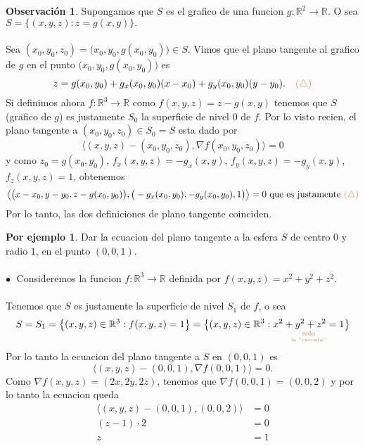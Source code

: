 \documentclass{article}
\theoremstyle{definition}
\newtheorem*{obs}{Observación}
\newtheorem*{ej}{Por ejemplo}
\theoremstyle{remark}
\newcommand\bl{$\bullet\;$}
\begin{document}
  \begin{figure}[h]
\centering
\def\svgwidth{0.65\textwidth}
\makebox[\textwidth]{
}
\end{figure} 
\begin{obs}
  Supongamos que $S$ es el grafico de una funcion $g : \mathbb{R}^2 \to \mathbb{R}$. O sea $S=\big\{(x,y,z) : z=g(x,y)\big\}.$ \\\\ Sea $(x_0,y_0,z_0)=\big(x_0,y_0,g(x_0,y_0)\big) \in S$. Vimos que el plano tangente al grafico de $g$ en el punto $\big(x_0,y_0,g(x_0,y_0)\big)$ es \[
    z=g(x_0,y_0)+g_x(x_0,y_0)(x-x_0)+g_y(x_0,y_0)(y-y_0). \quad \textcolor{rojop2}{(\triangle)}
    \] Si definimos ahora $f : \mathbb{R}^3 \to \mathbb{R}$ como $f(x,y,z)=z-g(x,y)$ tenemos que $S$ (grafico de $g$) es justamente $S_0$ la superficie de nivel $0$ de $f$. Por lo visto recien, el plano tangente a $(x_0,y_0,z_0) \in S_0=S$ esta dado por \[
\big\langle (x,y,z)-(x_0,y_0,z_0),\nabla f(x_0,y_0,z_0) \big\rangle =0
\]y como $z_0=g(x_0,y_0)$, $f_x(x,y,z)=-g_x(x,y)$, \mbox{$f_y(x,y,z)=-g_y(x,y)$}, \mbox{$f_z(x,y,z)=1$,} obtenemos \[
\big\langle \big(x-x_0,y-y_0,z-g(x_0,y_0)\big),\big(-g_x(x_0,y_0),-g_y(x_0,y_0),1\big) \big\rangle =0 \text{ que es justamente }\textcolor{rojop2}{(\triangle)}
\] Por lo tanto, las dos definiciones de plano tangente coinciden.
\end{obs}
\begin{ej}
  Dar la ecuacion del plano tangente a la esfera $S$ de centro $0$ y radio $1$, en el punto $(0,0,1)$. \\\\
  \textcolor{rojop2}{\bl} Consideremos la funcion $f : \mathbb{R}^3 \to \mathbb{R}$ definida por $f(x,y,z)=x^2+y^2+z^2$.\\\\ Tenemos que $S$ es justamente la superficie de nivel $S_1$ de $f$, o sea \[
    S=S_1=\big\{(x,y,z) \in \mathbb{R}^3 : f(x,y,z)=1\big\}=\big\{(x,y,z) \in \mathbb{R}^3 : \underset{\underset{\textcolor{rojop2}{\text{la ``cascara''}}}{\textcolor{rojop2}{\text{solo}}}}{x^2+y^2+z^2 = 1}\big\}
    \]Por lo tanto la ecuacion del plano tangente a $S$ en $(0,0,1)$ es \[
\big\langle (x,y,z)-(0,0,1),\nabla f(0,0,1) \big\rangle = 0.
\] Como $\nabla f(x,y,z)=(2x,2y,2z)$, tenemos que $\nabla f (0,0,1)=(0,0,2)$ y por lo tanto la ecuacion queda \[
\begin{aligned}
  \big\langle (x,y,z) - (0,0,1),(0,0,2)\big\rangle & = 0 \\
  (z-1)\cdot 2 & = 0 \\
  z & = 1
\end{aligned}
\]
\end{ej} \; 
\end{document}
